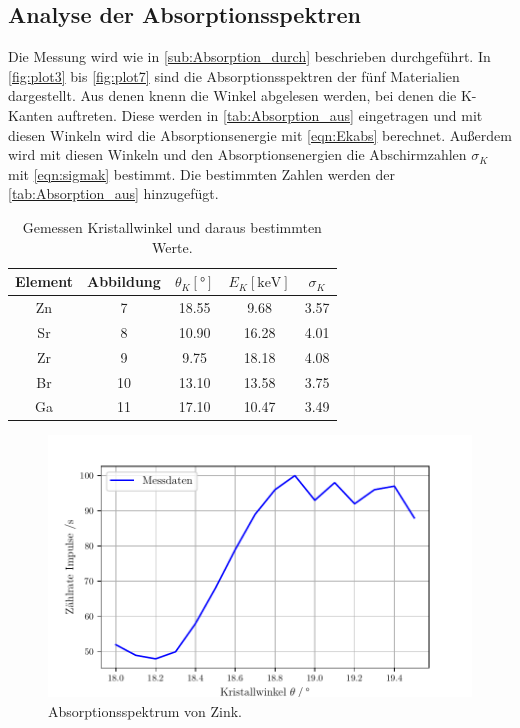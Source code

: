 \subsection{Analyse der Absorptionsspektren} %
\label{sub:Absorption_aus}
Die Messung wird wie in \autoref{sub:Absorption_durch} beschrieben durchgeführt.
In \autoref{fig:plot3} bis \ref{fig:plot7} sind die Absorptionsspektren der fünf Materialien dargestellt.
Aus denen knenn die Winkel abgelesen werden, bei denen die K-Kanten auftreten.
Diese werden in \autoref{tab:Absorption_aus} eingetragen und mit diesen Winkeln wird die Absorptionsenergie mit \autoref{eqn:Ekabs} berechnet.
Außerdem wird mit diesen Winkeln und den Absorptionsenergien die Abschirmzahlen $\sigma_K$ mit \autoref{eqn:sigmak} bestimmt.
Die bestimmten Zahlen werden der \autoref{tab:Absorption_aus} hinzugefügt.

\begin{table}[H]
  \centering
  \caption{Gemessen Kristallwinkel und daraus bestimmten Werte.}
  \label{tab:Absorption_aus}
  \begin{tabular}{c S[table-format=2.0] S S S[table-format=1.2] }
  \toprule
  {Element} & {Abbildung} & {$\theta_{K} [\si{\degree}]$} & {$E_{K} [\si{\kilo\electronvolt}]$}& {$\sigma_K$}\\
  \midrule
    Zn & 7  & 18.55 & 9.68  & 3.57 \\
    Sr & 8  & 10.90 & 16.28 & 4.01 \\
    Zr & 9  &  9.75 & 18.18 & 4.08 \\
    Br & 10 & 13.10 & 13.58 & 3.75 \\
    Ga & 11 & 17.10 & 10.47 & 3.49 \\ 
  \bottomrule
  \end{tabular}
\end{table}

\begin{figure}[H]
  \centering
  \includegraphics[width=\textwidth]{build/plot3.pdf}
  \caption{Absorptionsspektrum von Zink.}
  \label{fig:plot3}
\end{figure}

